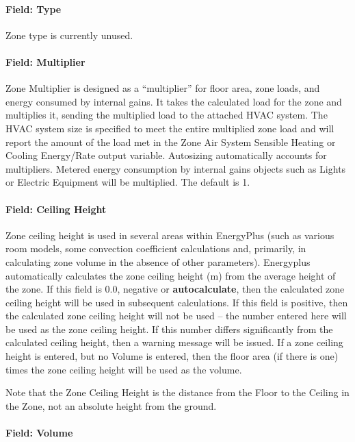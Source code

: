 \paragraph{Field: Type}\label{field-type-000}

Zone type is currently unused.

\paragraph{Field: Multiplier}\label{field-multiplier}

Zone Multiplier is designed as a ``multiplier'' for floor area, zone loads, and energy consumed by internal gains. It takes the calculated load for the zone and multiplies it, sending the multiplied load to the attached HVAC system. The HVAC system size is specified to meet the entire multiplied zone load and will report the amount of the load met in the Zone Air System Sensible Heating or Cooling Energy/Rate output variable. Autosizing automatically accounts for multipliers. Metered energy consumption by internal gains objects such as Lights or Electric Equipment will be multiplied. The default is 1.

\paragraph{Field: Ceiling Height}\label{field-ceiling-height}

Zone ceiling height is used in several areas within EnergyPlus (such as various room models, some convection coefficient calculations and, primarily, in calculating zone volume in the absence of other parameters). Energyplus automatically calculates the zone ceiling height (m) from the average height of the zone. If this field is 0.0, negative or \textbf{autocalculate}, then the calculated zone ceiling height will be used in subsequent calculations. If this field is positive, then the calculated zone ceiling height will not be used -- the number entered here will be used as the zone ceiling height. If this number differs significantly from the calculated ceiling height, then a warning message will be issued. If a zone ceiling height is entered, but no Volume is entered, then the floor area (if there is one) times the zone ceiling height will be used as the volume.

Note that the Zone Ceiling Height is the distance from the Floor to the Ceiling in the Zone, not an absolute height from the ground.

\paragraph{Field: Volume}\label{field-volume}

